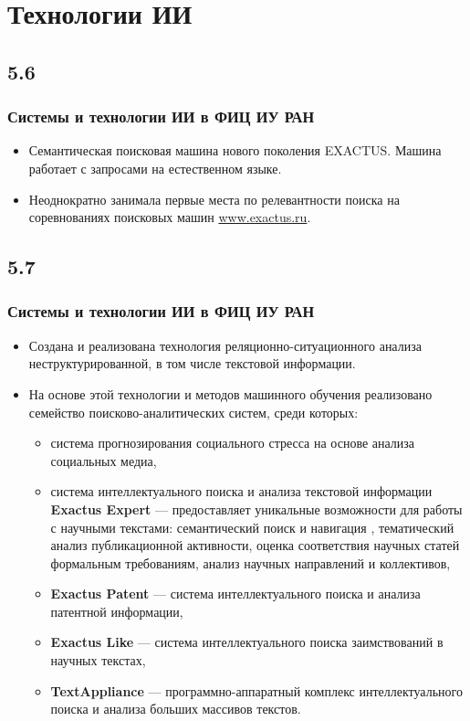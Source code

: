 \documentclass[default]{beamer}
\begin{document}
	\section{Технологии ИИ}

	\subsection{5.6}
	\begin{frame}
		\frametitle{Системы и технологии ИИ в ФИЦ ИУ РАН}
		\Large
		\begin{itemize}
			\item Семантическая поисковая машина нового поколения EXACTUS. Машина работает с запросами на естественном языке.
			\item Неоднократно занимала первые места по релевантности поиска на соревнованиях поисковых 	машин \href{www.exactus.ru}{www.exactus.ru}.
		\end{itemize}
	\end{frame}

	\subsection{5.7}
	\begin{frame}
		\frametitle{Системы и технологии ИИ в ФИЦ ИУ РАН}
		\footnotesize
		\begin{itemize}
			\item Создана и реализована технология реляционно-ситуационного анализа неструктурированной, в том числе текстовой информации.
			\item На основе этой технологии и методов машинного обучения реализовано семейство поисково-аналитических систем, среди которых:
			\begin{itemize}
				\scriptsize 
				\item система прогнозирования социального стресса на основе анализа социальных медиа, 
				\item система интеллектуального поиска и анализа текстовой информации \textbf{Exactus Expert} --- предоставляет уникальные возможности для работы с научными текстами: семантический поиск и навигация , тематический анализ публикационной активности, оценка соответствия научных статей формальным требованиям, анализ научных направлений и коллективов, 
				\item \textbf{Exactus Patent} --- система интеллектуального поиска и анализа патентной информации, 
				\item \textbf{Exactus Like} --- система интеллектуального поиска заимствований в научных текстах, 
				\item \textbf{TextAppliance} --- программно-аппаратный комплекс интеллектуального поиска и анализа больших массивов текстов.
			\end{itemize}
		\end{itemize}
	\end{frame}
\end{document}
